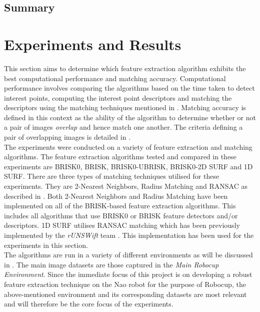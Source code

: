 \documentclass[11pt]{report}
\begin{document}
\section{Summary}
\label{sec:summary4}



\chapter{Experiments and Results}
\label{sec:experimentsResults}
This section aims to determine which feature extraction algorithm exhibits the best  computational performance and matching accuracy. Computational performance involves comparing the algorithms based on the time taken to detect interest points, computing the interest point descriptors and matching the descriptors using the matching techniques mentioned in . Matching accuracy is defined in this context as the ability of the algorithm to determine whether or not a pair of images \textit{overlap} and hence match one another. The criteria defining a pair of overlapping images is detailed in .\\


The experiments were conducted on a variety of feature extraction and matching algorithms. The feature extraction algorithms tested and compared in these experiments are BRISK0, BRISK, BRISK0-UBRISK, BRISK0-2D SURF and 1D SURF. There are three types of matching techniques utilised for these experiments. They are 2-Nearest Neighbors, Radius Matching and RANSAC as described in . Both 2-Nearest Neighbors and Radius Matching have been implemented on all of the BRISK-based feature extraction algorithms. This includes all algorithms that use BRISK0 or BRISK feature detectors and/or descriptors. 1D SURF utilises RANSAC matching which has been previously implemented by the \textit{rUNSWift} team \cite{Anderson}. This implementation has been used for the experiments in this section.\\ 

The algorithms are run in a variety of different environments as will be discussed in . The main image datasets are those captured in the \textit{Main Robocup Environment}. Since the immediate focus of this project is on developing a robust feature extraction technique on the Nao robot for the purpose of Robocup, the above-mentioned environment  and its corresponding datasets are most relevant and will therefore be the core focus of the experiments.\\
\end{document}
